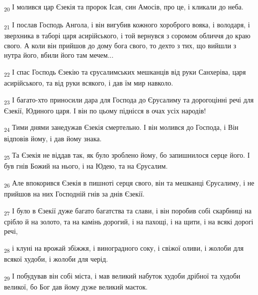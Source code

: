 \begin{tcolorbox}
\textsubscript{20} І молився цар Єзекія та пророк Ісая, син Амосів, про це, і кликали до неба.
\end{tcolorbox}
\begin{tcolorbox}
\textsubscript{21} І послав Господь Ангола, і він вигубив кожного хороброго вояка, і володаря, і зверхника в таборі царя асирійського, і той вернувся з соромом обличчя до краю свого. А коли він прийшов до дому бога свого, то дехто з тих, що вийшли з нутра його, вбили його там мечем...
\end{tcolorbox}
\begin{tcolorbox}
\textsubscript{22} І спас Господь Єзекію та єрусалимських мешканців від руки Санхеріва, царя асирійського, та від руки всякого, і дав їм мир навколо.
\end{tcolorbox}
\begin{tcolorbox}
\textsubscript{23} І багато-хто приносили дара для Господа до Єрусалиму та дорогоцінні речі для Єзекії, Юдиного царя. І він по цьому піднісся в очах усіх народів!
\end{tcolorbox}
\begin{tcolorbox}
\textsubscript{24} Тими днями занедужав Єзекія смертельно. І він молився до Господа, і Він відповів йому, і дав йому знака.
\end{tcolorbox}
\begin{tcolorbox}
\textsubscript{25} Та Єзекія не віддав так, як було зроблено йому, бо запишнилося серце його. І був гнів Божий на нього, і на Юдею, та на Єрусалим.
\end{tcolorbox}
\begin{tcolorbox}
\textsubscript{26} Але впокорився Єзекія в пишноті серця свого, він та мешканці Єрусалиму, і не прийшов на них Господній гнів за днів Єзекії.
\end{tcolorbox}
\begin{tcolorbox}
\textsubscript{27} І було в Єзекії дуже багато багатства та слави, і він поробив собі скарбниці на срібло й на золото, та на камінь дорогий, і на пахощі, і на щити, і на всякі дорогі речі,
\end{tcolorbox}
\begin{tcolorbox}
\textsubscript{28} і клуні на врожай збіжжя, і виноградного соку, і свіжої оливи, і жолоби для всякої худоби, і жолоби для черід.
\end{tcolorbox}
\begin{tcolorbox}
\textsubscript{29} І побудував він собі міста, і мав великий набуток худоби дрібної та худоби великої, бо Бог дав йому дуже великий маєток.
\end{tcolorbox}
